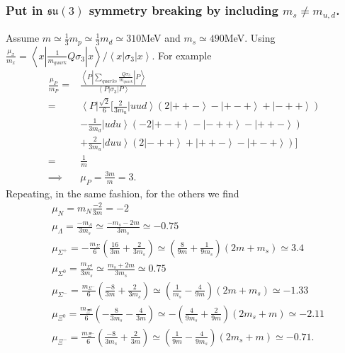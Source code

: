 \documentclass[main.tex]{subfiles}
\begin{document}
\subsubsection{Put in $\mathfrak{su}(3)$ symmetry breaking by including $m_s\neq m_{u,d}$.}
Assume $m\simeq\frac{1}{3}m_p\simeq\frac{1}{3}m_d\simeq310$MeV and $m_s\simeq490$MeV. Using $\frac{\mu_x}{m_x}=\left<x|\frac{1}{m_{quark}}Q\sigma_3|x\right>/\left<x|\sigma_3|x\right>$. For example
\begin{align}
\frac{\mu_P}{m_P}=&\frac{\left<P|\sum_{quarks}\frac{Q\sigma_3}{m_{quark}}|P\right>}{\left<P|\sigma_3|P\right>}\\
=&\left<P\right|\frac{\sqrt{2}}{6}\big[ \frac{2}{3m_u}\left|uud\right>(2\left|++-\right>-\left|+-+\right>+\left|-++\right>)\nonumber\\
&-\frac{1}{3m_d}\left|udu\right>(-2\left|+-+\right>-\left|-++\right>-\left|++-\right>)\nonumber\\
&+\frac{2}{3m_u}\left|duu\right>(2\left|-++\right>+\left|++-\right>-\left|+-+\right>)\big]\\
=&\frac{1}{m}\\
\implies&\mu_P=\frac{3m}{m}=3.
\end{align}
Repeating, in the same fashion, for the others we find
\begin{align}
&\mu_N=m_N\frac{-2}{3m}=-2\\
&\mu_{\Lambda}=\frac{-m_{\Lambda}}{3m_s}\simeq\frac{-m_s-2m}{3m_s}\simeq-0.75\\
&\mu_{\Sigma^+}=-\frac{m_{\Sigma}}{6}(\frac{16}{3m}+\frac{2}{3m_s})\simeq(\frac{8}{9m}+\frac{1}{9m_s})(2m+m_s)\simeq3.4\\
&\mu_{\Sigma^0}=\frac{m_{\Sigma^0}}{3m_s}\simeq\frac{m_s+2m}{3m_s}\simeq0.75\\
&\mu_{\Sigma^-}=\frac{m_{\Sigma^-}}{6}(\frac{-8}{3m}+\frac{2}{3m_s})\simeq(\frac{1}{m_s}-\frac{4}{9m})(2m+m_s)\simeq-1.33\\
&\mu_{\Xi^0}=\frac{m_{\Xi^0}}{6}(-\frac{8}{3m_s}-\frac{4}{3m})\simeq-(\frac{4}{9m_s}+\frac{2}{9m})(2m_s+m)\simeq-2.11\\
&\mu_{\Xi^-}=\frac{m_{\Xi^-}}{6}(\frac{-8}{3m_s}+\frac{2}{3m})\simeq(\frac{1}{9m}-\frac{4}{9m_s})(2m_s+m)\simeq-0.71.
\end{align}
\end{document}
